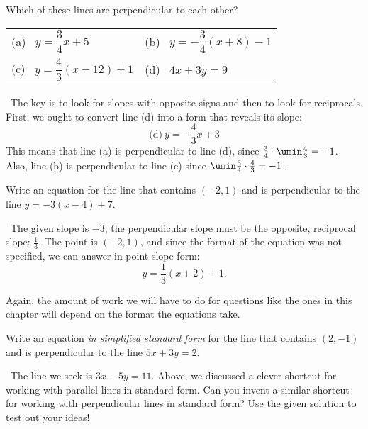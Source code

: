 \begin{boxedex}
Which of these lines are perpendicular to each other?

\begin{center}
\begin{tabularx}{0.8\linewidth}{XX}
(a)~ $y=\dfrac{3}{4}x+5$
&
(b)~ $y=-\dfrac{3}{4}(x+8)-1$
\\[3ex]
(c)~ $y=\dfrac{4}{3}(x-12)+1$
&
(d)~ $4x+3y=9$
\end{tabularx}
\end{center}

\exsoln\ The key is to look for slopes with opposite signs and then to look for reciprocals. First, we ought to convert line (d) into a form that reveals its slope: \[\text{(d)}~y=-\frac{4}{3}x + 3\] This means that line (a) is perpendicular to line (d), since $\frac{3}{4}\cdot\umin\frac{4}{3}=-1$. Also, line (b) is perpendicular to line (c) since $\umin\frac{3}{4}\cdot\frac{4}{3}=-1$.
\end{boxedex}

\begin{boxedex}
Write an equation for the line that contains $(-2,1)$ and is perpendicular to the line $y=-3(x-4) + 7$.

\exsoln\ The given slope is $-3$, the perpendicular slope must be the opposite, reciprocal slope: $\frac{1}{3}$. The point is $(-2,1)$, and since the format of the equation was not specified, we can answer in point-slope form: \[y = \frac{1}{3}(x+2)+1.\]
\end{boxedex}

Again, the amount of work we will have to do for questions like the ones in this chapter will depend on the format the equations take.

\begin{boxedex}
Write an equation \textit{in simplified standard form} for the line that contains $(2,-1)$ and is perpendicular to the line $5x+3y=2$.

\expsoln\ The line we seek is $3x-5y=11$. Above, we discussed a clever shortcut for working with parallel lines in standard form. Can you invent a similar shortcut for working with perpendicular lines in standard form? Use the given solution to test out your ideas!
%
\end{boxedex}
